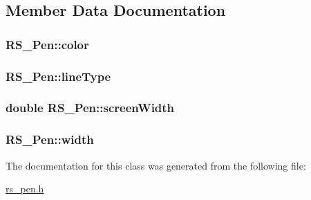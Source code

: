 \subsection{Member Data Documentation}
\hypertarget{class_r_s___pen_a4b44b65046fe820fdc3661c2f47660ae}{
\subsubsection[{color}]{ R\-S\-\_\-\-Pen\-::color\hspace{0.3cm}{\ttfamily [protected]}}}\label{class_r_s___pen_a4b44b65046fe820fdc3661c2f47660ae}
\hypertarget{class_r_s___pen_a69545beb2a93c9d20cb679d909d3224b}{
\subsubsection[{line\-Type}]{ R\-S\-\_\-\-Pen\-::line\-Type\hspace{0.3cm}{\ttfamily [protected]}}}\label{class_r_s___pen_a69545beb2a93c9d20cb679d909d3224b}
\hypertarget{class_r_s___pen_a137d5080a8cd36268b4fea3fa12c1418}{
\subsubsection[{screen\-Width}]{\setlength{\rightskip}{0pt plus 5cm}double R\-S\-\_\-\-Pen\-::screen\-Width\hspace{0.3cm}{\ttfamily [protected]}}}\label{class_r_s___pen_a137d5080a8cd36268b4fea3fa12c1418}
\hypertarget{class_r_s___pen_a2433e433183b582fe538e6fd2b4588cf}{
\subsubsection[{width}]{ R\-S\-\_\-\-Pen\-::width\hspace{0.3cm}{\ttfamily [protected]}}}\label{class_r_s___pen_a2433e433183b582fe538e6fd2b4588cf}


The documentation for this class was generated from the following file\-:\begin{DoxyCompactItemize}
\item 
\hyperlink{rs__pen_8h}{rs\-\_\-pen.\-h}\end{DoxyCompactItemize}
